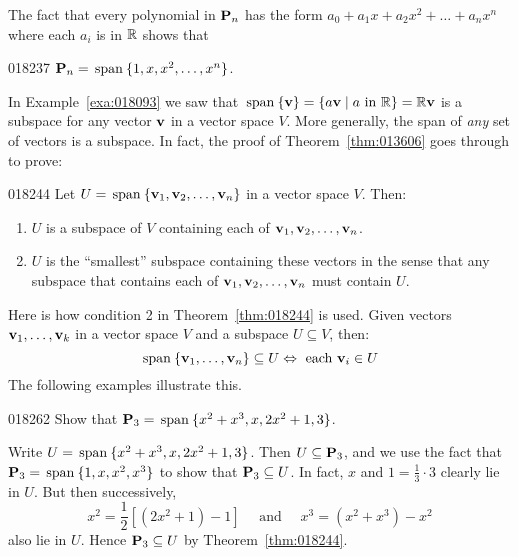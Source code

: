 The fact that every polynomial in $\textbf{P}_{n}$ has the form $a_{0} + a_{1}x + a_{2}x^{2} + \dots+ a_{n}x^{n}$ where each $a_{i}$ is in $\mathbb{R}$ shows that

\begin{example}{}{018237}
$\textbf{P}_{n} = \thinspace\operatorname{span\medspace}\{1, x, x^{2}, \dots, x^{n}\}$.
\end{example}

\noindent In Example~\ref{exa:018093} we saw that $\thinspace\operatorname{span\medspace}\{\textbf{v}\} = \{a\textbf{v} \mid a \mbox{ in } \mathbb{R}\} = \mathbb{R}\textbf{v}$ is a subspace for any vector $\textbf{v}$ in a vector space $V$. More generally, the span of \textit{any} set of vectors is a subspace. In fact, the proof of Theorem~\ref{thm:013606} goes through to prove:

\begin{theorem}{}{018244}
Let $U = \thinspace\operatorname{span\medspace}\{\textbf{v}_{1}, \textbf{v}_{2}, \dots, \textbf{v}_{n}\}$ in a vector space $V$. Then:

\begin{enumerate}
\item $U$ is a subspace of $V$ containing each of $\textbf{v}_{1}, \textbf{v}_{2}, \dots, \textbf{v}_{n}$.

\item $U$ is the ``smallest'' subspace containing these vectors in the sense that any subspace that contains each of $\textbf{v}_{1}, \textbf{v}_{2}, \dots, \textbf{v}_{n}$ must contain $U$.

\end{enumerate}
\end{theorem}

Here is how condition 2 in Theorem~\ref{thm:018244} is used. Given vectors $\textbf{v}_1, \dots, \textbf{v}_{k}$ in a vector space $V$ and a subspace $U \subseteq V$, then:
\begin{equation*}
 \thinspace\operatorname{span\medspace}\{\textbf{v}_{1}, \dots, \textbf{v}_{n}\} \subseteq U \Leftrightarrow \mbox{ each } \textbf{v}_i \in U
\end{equation*}
The following examples illustrate this. 

\begin{example}{}{018262}
Show that $\textbf{P}_{3} = \thinspace\operatorname{span\medspace}\{x^{2} + x^{3}, x, 2x^{2} + 1, 3\}$.

\begin{solution}
Write $U = \thinspace\operatorname{span\medspace}\{x^{2} + x^{3}, x, 2x^{2} + 1, 3\}$. Then $U \subseteq \textbf{P}_{3}$, and we use the fact that $\textbf{P}_{3} = \thinspace\operatorname{span\medspace}\{1, x, x^{2}, x^{3}\}$ to show that $\textbf{P}_{3} \subseteq U$. In fact, $x$ and $1 = \frac{1}{3} \cdot 3$ clearly lie in $U$. But then successively,
\begin{equation*}
x^2 = \frac{1}{2}[(2x^2 + 1) - 1] \quad \mbox{ and } \quad x^3 = (x^2 + x^3) - x^2
\end{equation*}
also lie in $U$. Hence $\textbf{P}_{3} \subseteq U$ by Theorem~\ref{thm:018244}.
\end{solution}
\end{example}

